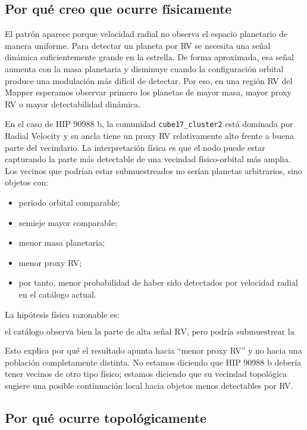 \documentclass[11pt]{article}
\begin{document}
\subsection{Por qué creo que ocurre físicamente}

El patrón aparece porque velocidad radial no observa el espacio planetario de manera uniforme. Para detectar un planeta por RV se necesita una señal dinámica suficientemente grande en la estrella. De forma aproximada, esa señal aumenta con la masa planetaria y disminuye cuando la configuración orbital produce una modulación más difícil de detectar. Por eso, en una región RV del Mapper esperamos observar primero los planetas de mayor masa, mayor proxy RV o mayor detectabilidad dinámica.

En el caso de HIP 90988 b, la comunidad \texttt{cube17\_cluster2} está dominada por Radial Velocity y su ancla tiene un proxy RV relativamente alto frente a buena parte del vecindario. La interpretación física es que el nodo puede estar capturando la parte más detectable de una vecindad físico-orbital más amplia. Los vecinos que podrían estar submuestreados no serían planetas arbitrarios, sino objetos con:

\begin{itemize}
    \item periodo orbital comparable;
    \item semieje mayor comparable;
    \item menor masa planetaria;
    \item menor proxy RV;
    \item por tanto, menor probabilidad de haber sido detectados por velocidad radial en el catálogo actual.
\end{itemize}

La hipótesis física razonable es:

\[
\boxed{
\text{el catálogo observa bien la parte de alta señal RV, pero podría submuestrear la extensión de menor masa.}
}
\]

Esto explica por qué el resultado apunta hacia ``menor proxy RV'' y no hacia una población completamente distinta. No estamos diciendo que HIP 90988 b debería tener vecinos de otro tipo físico; estamos diciendo que su vecindad topológica sugiere una posible continuación local hacia objetos menos detectables por RV.

\subsection{Por qué ocurre topológicamente}
\end{document}
